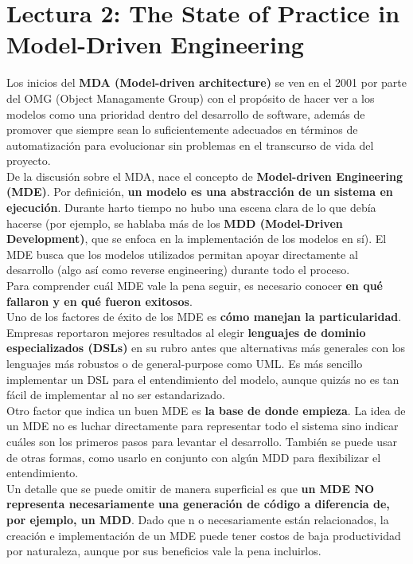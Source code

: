 \section*{Lectura 2: The State of Practice in Model-Driven
  Engineering}

Los inicios del \textbf{MDA (Model-driven architecture)} se
ven en el 2001 por parte del OMG (Object Managamente Group)
con el propósito de hacer ver a los modelos como una
prioridad dentro del desarrollo de software, además de
promover que siempre sean lo suficientemente adecuados en
términos de automatización para evolucionar sin problemas en
el transcurso de vida del proyecto. \\

De la discusión sobre el MDA, nace el concepto de
\textbf{Model-driven Engineering (MDE)}. Por definición,
\textbf{un modelo es una abstracción de un sistema en
ejecución}. Durante harto tiempo no hubo una escena clara de
lo que debía hacerse (por ejemplo, se hablaba más de los
\textbf{MDD (Model-Driven Development)}, que se enfoca en la
implementación de los modelos en sí). El MDE busca que los
modelos utilizados permitan apoyar directamente al
desarrollo (algo así como reverse engineering) durante todo
el proceso. \\

Para comprender cuál MDE vale la pena seguir, es necesario
conocer \textbf{en qué fallaron y en qué fueron exitosos}. \\

Uno de los factores de éxito de los MDE es \textbf{cómo
manejan la particularidad}. Empresas reportaron mejores
resultados al elegir \textbf{lenguajes de dominio
especializados (DSLs)} en su rubro antes que alternativas
más generales con los lenguajes más robustos o de
general-purpose como UML. Es más sencillo implementar un
DSL para el entendimiento del modelo, aunque quizás no es
tan fácil de implementar al no ser estandarizado. \\

Otro factor que indica un buen MDE es \textbf{la base de
donde empieza}. La idea de un MDE no es luchar directamente
para representar todo el sistema sino indicar cuáles son los
primeros pasos para levantar el desarrollo. También se puede
usar de otras formas, como usarlo en conjunto con algún MDD
para flexibilizar el entendimiento. \\

Un detalle que se puede omitir de manera superficial es que
\textbf{un MDE NO representa necesariamente una generación
de código a diferencia de, por ejemplo, un MDD}. Dado que n
o necesariamente están relacionados, la creación e
implementación de un MDE puede tener costos de
baja productividad por naturaleza, aunque por sus beneficios
vale la pena incluirlos. \\

